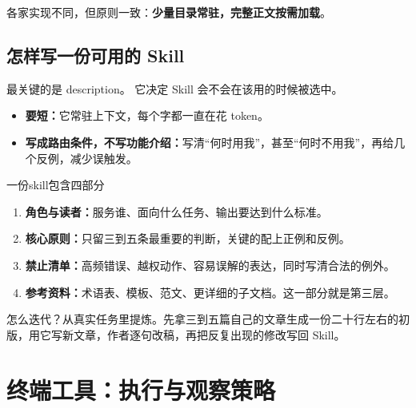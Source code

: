 各家实现不同，但原则一致：\textbf{少量目录常驻，完整正文按需加载}。

\subsection{怎样写一份可用的 Skill}
最关键的是 description。 它决定 Skill 会不会在该用的时候被选中。
\begin{itemize}
  \item \textbf{要短：}它常驻上下文，每个字都一直在花 token。
  \item \textbf{写成路由条件，不写功能介绍：}写清“何时用我”，甚至“何时不用我”，再给几个反例，减少误触发。
\end{itemize}
一份skill包含四部分
\begin{enumerate}
  \item \textbf{角色与读者：}服务谁、面向什么任务、输出要达到什么标准。
  \item \textbf{核心原则：}只留三到五条最重要的判断，关键的配上正例和反例。
  \item \textbf{禁止清单：}高频错误、越权动作、容易误解的表达，同时写清合法的例外。
  \item \textbf{参考资料：}术语表、模板、范文、更详细的子文档。这一部分就是第三层。
\end{enumerate}
怎么迭代？从真实任务里提炼。先拿三到五篇自己的文章生成一份二十行左右的初版，用它写新文章，作者逐句改稿，再把反复出现的修改写回 Skill。
\section{终端工具：执行与观察策略}
